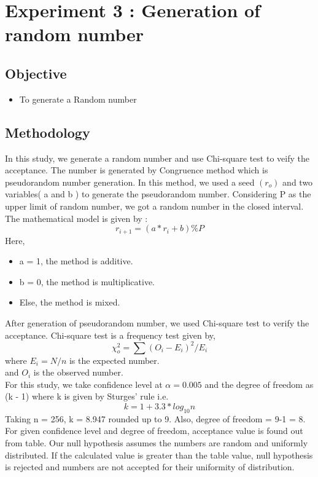 \documentclass[10pt,journal,cspaper,compsoc]{IEEEtran}
\begin{document}
\section{Experiment 3 : Generation of random number}
\subsection{Objective}
  \begin{itemize}
    \item To generate a Random number
  \end{itemize}
\subsection{Methodology}
  In this study, we generate a random number and use Chi-square test to veify the acceptance.
  The number is generated by Congruence method which is pseudorandom number generation. 
  In this method, we used a seed \begin{math}
    (r_o)
  \end{math} and two variables( a and b ) to generate the pseudorandom number.
  Considering P as the upper limit of random number, we got a random number in the closed interval.
  The mathematical model is given by :
  \begin{equation}
    r_{i+1} = (a * r_i + b) \%  P
  \end{equation}
  Here,
  \begin{itemize}
    \item a = 1, the method is additive.
    \item b = 0, the method is multiplicative.
    \item Else, the method is mixed. 
  \end{itemize}
  After generation of pseudorandom number, we used Chi-square test to verify the acceptance.
  Chi-square test is a frequency test given by,
  \begin{equation}
    \chi _o ^2 = \sum (O_i - E_i)^2 / E_i
  \end{equation}
  where 
  \begin{math}
    E_i = N/n
  \end{math}
  is the expected number.\\
  and \begin{math} O_i \end{math}  is the observed number.\\
  For this study, we take confidence level at \begin{math}
    \alpha = 0.005
  \end{math} and the degree of freedom as (k - 1) where k is given by Sturges' rule i.e.
  \begin{equation}
    k = 1 + 3.3 * log_{10}n
  \end{equation}
  Taking n = 256, k = 8.947 rounded up to 9. Also, degree of freedom = 9-1 = 8.\\
  For given confidence level and degree of freedom, acceptance value is found out from table. 
  Our null hypothesis assumes the numbers are random and uniformly distributed.
  If the calculated value is greater than the table value, null hypothesis is rejected and numbers are not accepted for their uniformity of distribution.
  \cite{lab3}
\end{document}
